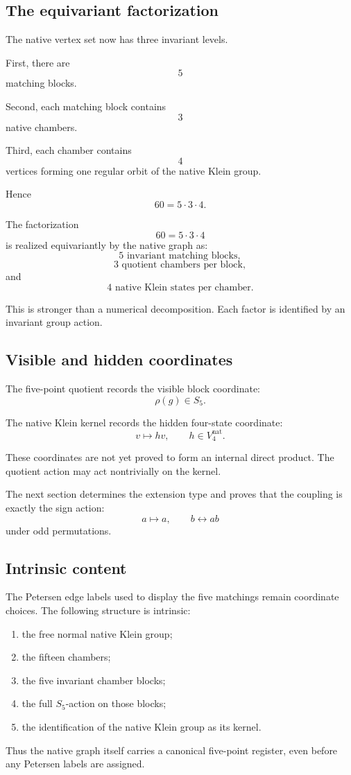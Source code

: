 \subsection{The equivariant factorization}

The native vertex set now has three invariant levels.

First, there are
\[
5
\]
matching blocks.

Second, each matching block contains
\[
3
\]
native chambers.

Third, each chamber contains
\[
4
\]
vertices forming one regular orbit of the native Klein group.

Hence
\[
60
=
5\cdot3\cdot4.
\]

\begin{theorem}
The factorization
\[
60=5\cdot3\cdot4
\]
is realized equivariantly by the native graph as:
\[
5
\text{ invariant matching blocks},
\]
\[
3
\text{ quotient chambers per block},
\]
and
\[
4
\text{ native Klein states per chamber}.
\]
\end{theorem}

This is stronger than a numerical decomposition. Each factor is
identified by an invariant group action.

\subsection{Visible and hidden coordinates}

The five-point quotient records the visible block coordinate:
\[
\rho(g)\in S_5.
\]

The native Klein kernel records the hidden four-state coordinate:
\[
v\mapsto hv,
\qquad
h\in V_4^{\mathrm{nat}}.
\]

These coordinates are not yet proved to form an internal direct
product. The quotient action may act nontrivially on the kernel.

The next section determines the extension type and proves that the
coupling is exactly the sign action:
\[
a\mapsto a,
\qquad
b\leftrightarrow ab
\]
under odd permutations.

\subsection{Intrinsic content}

The Petersen edge labels used to display the five matchings remain
coordinate choices. The following structure is intrinsic:

\begin{enumerate}
    \item the free normal native Klein group;
    \item the fifteen chambers;
    \item the five invariant chamber blocks;
    \item the full \(S_5\)-action on those blocks;
    \item the identification of the native Klein group as its kernel.
\end{enumerate}

Thus the native graph itself carries a canonical five-point register,
even before any Petersen labels are assigned.
